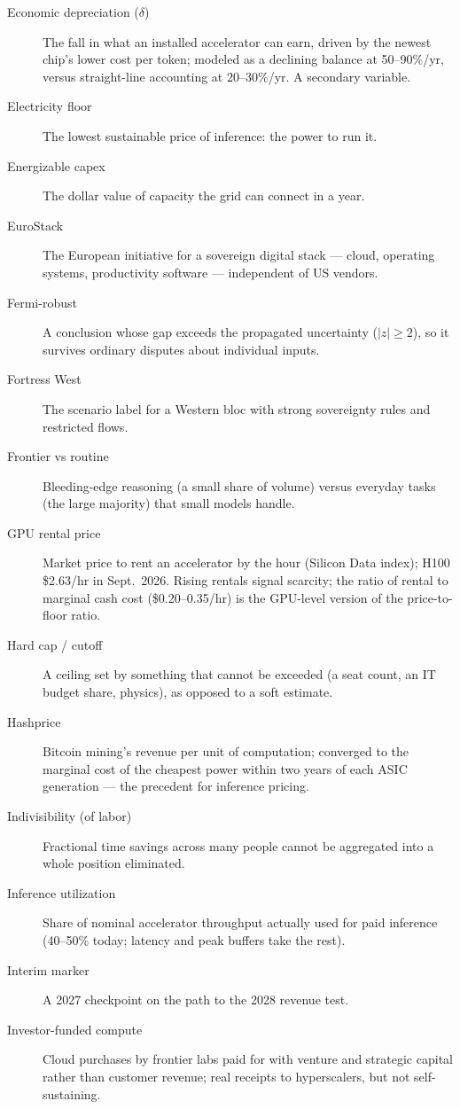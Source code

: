 \documentclass[11pt,letterpaper]{article}
\begin{document}
\begin{description}
\item[Economic depreciation ($\delta$)] The fall in what an installed accelerator can earn, driven by the newest chip's lower cost per token; modeled as a declining balance at 50--90\%/yr, versus straight-line accounting at 20--30\%/yr. A secondary variable.
\item[Electricity floor] The lowest sustainable price of inference: the power to run it.
\item[Energizable capex] The dollar value of capacity the grid can connect in a year.
\item[EuroStack] The European initiative for a sovereign digital stack --- cloud, operating systems, productivity software --- independent of US vendors.
\item[Fermi-robust] A conclusion whose gap exceeds the propagated uncertainty ($|z|\ge2$), so it survives ordinary disputes about individual inputs.
\item[Fortress West] The scenario label for a Western bloc with strong sovereignty rules and restricted flows.
\item[Frontier vs routine] Bleeding-edge reasoning (a small share of volume) versus everyday tasks (the large majority) that small models handle.
\item[GPU rental price] Market price to rent an accelerator by the hour (Silicon Data index); H100 \$2.63/hr in Sept.~2026. Rising rentals signal scarcity; the ratio of rental to marginal cash cost (\$0.20--0.35/hr) is the GPU-level version of the price-to-floor ratio.
\item[Hard cap / cutoff] A ceiling set by something that cannot be exceeded (a seat count, an IT budget share, physics), as opposed to a soft estimate.
\item[Hashprice] Bitcoin mining's revenue per unit of computation; converged to the marginal cost of the cheapest power within two years of each ASIC generation --- the precedent for inference pricing.
\item[Indivisibility (of labor)] Fractional time savings across many people cannot be aggregated into a whole position eliminated.
\item[Inference utilization] Share of nominal accelerator throughput actually used for paid inference (40--50\% today; latency and peak buffers take the rest).
\item[Interim marker] A 2027 checkpoint on the path to the 2028 revenue test.
\item[Investor-funded compute] Cloud purchases by frontier labs paid for with venture and strategic capital rather than customer revenue; real receipts to hyperscalers, but not self-sustaining.

\end{description}
\end{document}
